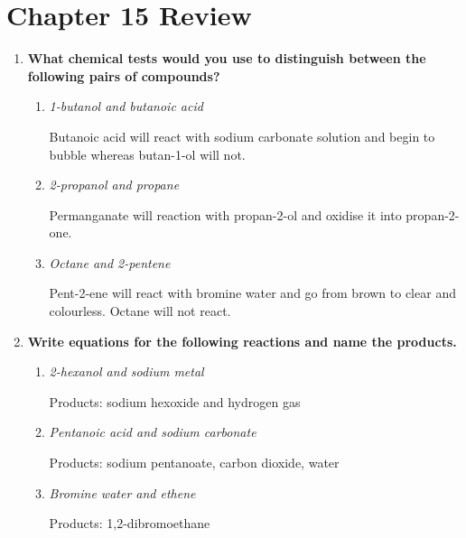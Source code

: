 \documentclass{report}
\begin{document}
\newpage

\chapter*{Chapter 15 Review}

	\begin{enumerate}
		\item \textbf{What chemical tests would you use to distinguish between the following pairs of compounds?}

			\begin{enumerate}
				\item \textit{1-butanol and butanoic acid}

					Butanoic acid will react with sodium carbonate solution and begin to bubble whereas butan-1-ol will not.

				\item \textit{2-propanol and propane}

					Permanganate will reaction with propan-2-ol and oxidise it into propan-2-one.

				\item \textit{Octane and 2-pentene}

					Pent-2-ene will react with bromine water and go from brown to clear and colourless. Octane will not react.
			\end{enumerate}

		\item \textbf{Write equations for the following reactions and name the products.}

			\begin{enumerate}
				\item \textit{2-hexanol and sodium metal}


					Products: sodium hexoxide and hydrogen gas

				\item \textit{Pentanoic acid and sodium carbonate}


					Products: sodium pentanoate, carbon dioxide, water

				\item \textit{Bromine water and ethene}


					Products: 1,2-dibromoethane
			\end{enumerate}


\end{enumerate}
\end{document}
